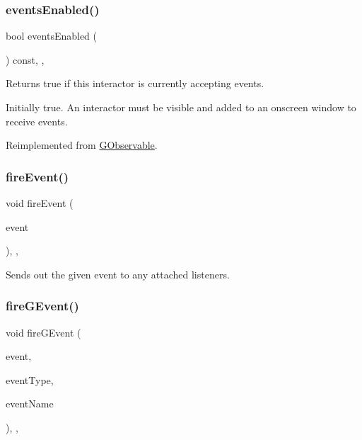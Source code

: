\subsubsection{\texorpdfstring{events\+Enabled()}{eventsEnabled()}}
{\footnotesize\ttfamily bool events\+Enabled (\begin{DoxyParamCaption}{ }\end{DoxyParamCaption}) const\hspace{0.3cm}{\ttfamily [override]}, {\ttfamily [virtual]}, {\ttfamily [inherited]}}



Returns true if this interactor is currently accepting events. 

Initially true. An interactor must be visible and added to an onscreen window to receive events. 

Reimplemented from \mbox{\hyperlink{classGObservable_a8ebb3da91032e7f4c34485dabc518b8a}{G\+Observable}}.

\mbox{\label{classGObservable_a63e5e5a6227c59c928493b11aceb0f67}} 
\subsubsection{\texorpdfstring{fire\+Event()}{fireEvent()}}
{\footnotesize\ttfamily void fire\+Event (\begin{DoxyParamCaption}\item[{\mbox{\hyperlink{classGEvent}{G\+Event}} \&}]{event }\end{DoxyParamCaption})\hspace{0.3cm}{\ttfamily [protected]}, {\ttfamily [virtual]}, {\ttfamily [inherited]}}



Sends out the given event to any attached listeners. 

\mbox{\label{classGObservable_ab3983ea07337b52020a29cc00c653d8d}} 
\subsubsection{\texorpdfstring{fire\+G\+Event()}{fireGEvent()}\hspace{0.1cm}{\footnotesize\ttfamily [1/8]}}
{\footnotesize\ttfamily void fire\+G\+Event (\begin{DoxyParamCaption}\item[{Q\+Event $\ast$}]{event,  }\item[{Event\+Type}]{event\+Type,  }\item[{const std\+::string \&}]{event\+Name }\end{DoxyParamCaption})\hspace{0.3cm}{\ttfamily [protected]}, {\ttfamily [virtual]}, {\ttfamily [inherited]}}



